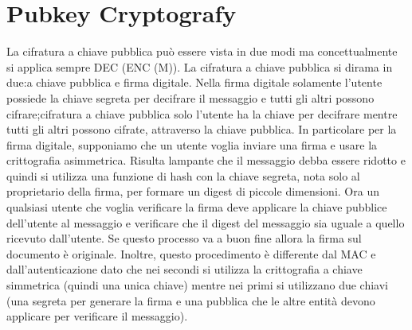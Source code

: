 \documentclass{article}
\begin{document}
\section{Pubkey Cryptografy}
La cifratura a chiave pubblica può essere vista in due modi ma concettualmente si applica sempre DEC (ENC (M))\@.
La cifratura a chiave pubblica si dirama in due:\@cifratura a chiave pubblica e firma digitale\@.\newline
Nella firma digitale solamente l'utente possiede la chiave segreta per decifrare il messaggio e tutti gli altri possono cifrare;\@nella cifratura a chiave pubblica solo l'utente ha la chiave per decifrare mentre tutti gli altri possono cifrate, attraverso la chiave pubblica\@. In particolare per la firma digitale, supponiamo che un utente voglia inviare una firma e usare la crittografia asimmetrica\@. Risulta lampante che il messaggio debba essere ridotto e quindi si utilizza una funzione di hash con la chiave segreta, nota solo al proprietario della firma, per formare un digest di piccole dimensioni\@. Ora un qualsiasi utente che voglia verificare la firma deve applicare la chiave pubblice dell'utente al messaggio e verificare che il digest del messaggio sia uguale a quello ricevuto dall'utente\@. Se questo processo va a buon fine allora la firma sul documento è originale\@.\newline
Inoltre, questo procedimento è differente dal MAC e dall'autenticazione dato che nei secondi si utilizza la crittografia a chiave simmetrica (quindi una unica chiave) mentre nei primi si utilizzano due chiavi (una segreta per generare la firma e una pubblica che le altre entità devono applicare per verificare il messaggio).
\end{document}
